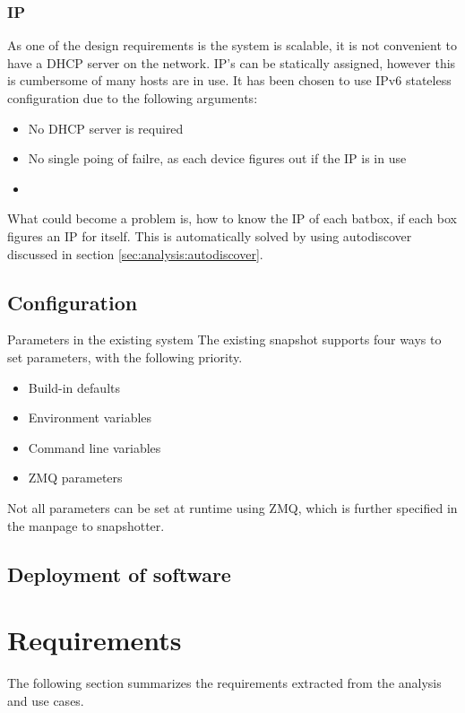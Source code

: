 \subsubsection{IP}
As one of the design requirements is the system is scalable, it is not convenient to have a DHCP server on the network. IP's can be statically assigned, however this is cumbersome of many hosts are in use. It has been chosen to use IPv6 stateless configuration due to the following arguments:
\begin{itemize}
	\item No DHCP server is required
	\item No single poing of failre, as each device figures out if the IP is in use
	\item 
\end{itemize}

What could become a problem is, how to know the IP of each batbox, if each box figures an IP for itself. This is automatically solved by using autodiscover discussed in section \ref{sec:analysis:autodiscover}.

\subsection{Configuration}
Parameters in the existing system
The existing snapshot supports four ways to set parameters, with the following priority.
\begin{itemize}
	\item Build-in defaults
	\item Environment variables
	\item Command line variables
	\item ZMQ parameters
\end{itemize}

Not all parameters can be set at runtime using ZMQ, which is further specified in the manpage to snapshotter.


\subsection{Deployment of software}

\section{Requirements}
The following section summarizes the requirements extracted from the analysis and use cases.

